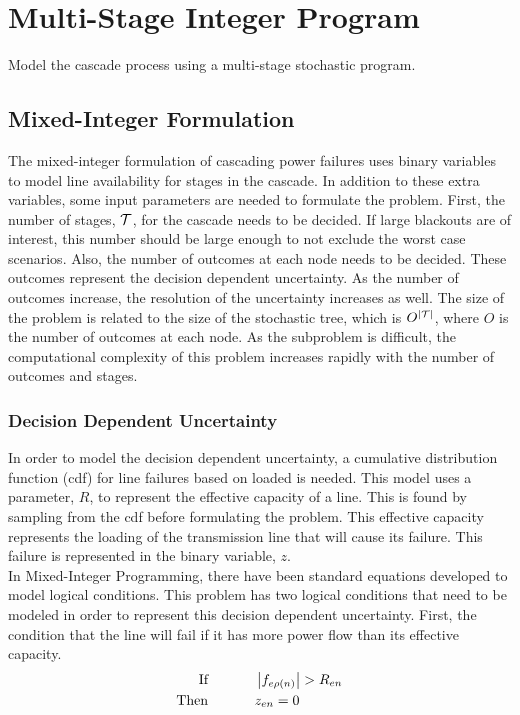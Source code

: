 \chapter{Multi-Stage Integer Program}

Model the cascade process using a multi-stage stochastic program.


\section{Mixed-Integer Formulation}
The mixed-integer formulation of cascading power failures uses binary variables to model line availability for stages in the cascade.  In addition to these extra variables, some input parameters are needed to formulate the problem.  First, the number of stages, $\mathcal{T}$, for the cascade needs to be decided.  If large blackouts are of interest, this number should be large enough to not exclude the worst case scenarios.  Also, the number of outcomes at each node needs to be decided.  These outcomes represent the decision dependent uncertainty.  As the number of outcomes increase, the resolution of the uncertainty increases as well.  The size of the problem is related to the size of the stochastic tree, which is $O^{ \left| \mathcal{T} \right| }$, where $O$ is the number of outcomes at each node.  As the subproblem is difficult, the computational complexity of this problem increases rapidly with the number of outcomes and stages.



\subsection{Decision Dependent Uncertainty}
In order to model the decision dependent uncertainty, a cumulative distribution function (cdf) for line failures based on loaded is needed.  This model uses a parameter, $R$, to represent the effective capacity of a line.  This is found by sampling from the cdf before formulating the problem.  This effective capacity represents the loading of the transmission line that will cause its failure.  This failure is represented in the binary variable, $z$. \\

In Mixed-Integer Programming, there have been standard equations developed to model logical conditions.  This problem has two logical conditions that need to be modeled in order to represent this decision dependent uncertainty.  First, the condition that the line will fail if it has more power flow than its effective capacity.
\begin{align*}
\mbox{If }
		\hspace{30px}&\left| f_{e\rho(n)} \right| > R_{en}  \\
\mbox{Then }
		\hspace{30px}&z_{en} = 0
\end{align*}

